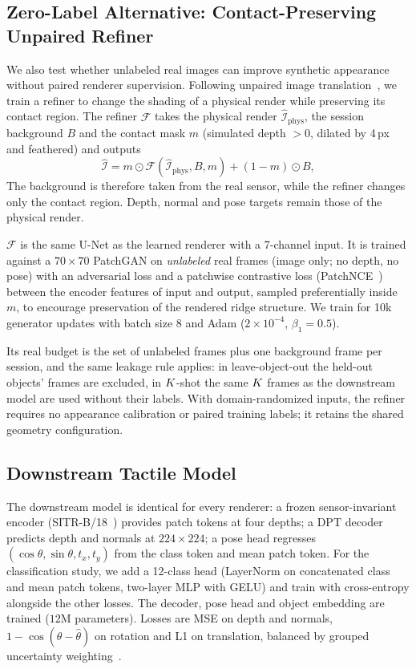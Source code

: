 \subsection{Zero-Label Alternative: Contact-Preserving Unpaired Refiner}
\label{sec:refiner}
We also test whether unlabeled real images can improve synthetic appearance without paired renderer supervision. Following unpaired image translation~\cite{shrivastava2017simgan,park2020cut,chen2022cyclegan}, we train a refiner to change the shading of a physical render while preserving its contact region. The refiner $\mathcal{F}$ takes the physical render $\hat{\mathcal{I}}_{\mathrm{phys}}$, the session background $B$ and the contact mask $m$ (simulated depth $>0$, dilated by 4\,px and feathered) and outputs
\begin{equation}
    \hat{\mathcal{I}} = m \odot \mathcal{F}(\hat{\mathcal{I}}_{\mathrm{phys}}, B, m) + (1-m) \odot B ,
\end{equation}
The background is therefore taken from the real sensor, while the refiner changes only the contact region. Depth, normal and pose targets remain those of the physical render.

 $\mathcal{F}$ is the same U-Net as the learned renderer with a 7-channel input. It is trained against a $70\times70$ PatchGAN on \emph{unlabeled} real frames (image only; no depth, no pose) with an adversarial loss and a patchwise contrastive loss (PatchNCE~\cite{park2020cut}) between the encoder features of input and output, sampled preferentially inside $m$, to encourage preservation of the rendered ridge structure. We train for 10k generator updates with batch size 8 and Adam ($2\times10^{-4}$, $\beta_1=0.5$).

Its real budget is the set of unlabeled frames plus one background frame per session, and the same leakage rule applies: in leave-object-out the held-out objects' frames are excluded, in $K$-shot the same $K$ frames as the downstream model are used without their labels. With domain-randomized inputs, the refiner requires no appearance calibration or paired training labels; it retains the shared geometry configuration.

\subsection{Downstream Tactile Model}
The downstream model is identical for every renderer: a frozen sensor-invariant encoder (SITR-B/18~\cite{gupta2025sitr}) provides patch tokens at four depths; a DPT decoder~\cite{ranftl2021dpt} predicts depth and normals at $224\times224$; a pose head regresses $(\cos\theta,\sin\theta,t_x,t_y)$ from the class token and mean patch token. For the classification study, we add a 12-class head (LayerNorm on concatenated class and mean patch tokens, two-layer MLP with GELU) and train with cross-entropy alongside the other losses. The decoder, pose head and object embedding are trained ($12$M parameters). Losses are MSE on depth and normals, $1-\cos(\theta-\hat\theta)$ on rotation and L1 on translation, balanced by grouped uncertainty weighting~\cite{kendall2018multi}.

